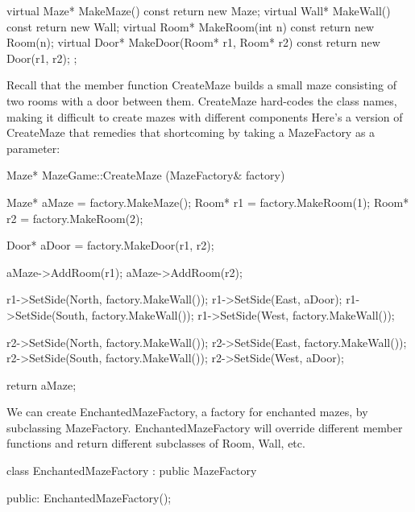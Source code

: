 \documentclass{report}
\begin{document}
\begin{itemize}
\begin{cppcode}
{                        virtual Maze* MakeMaze() const
                        { return new Maze; }
                        virtual Wall* MakeWall() const
                        { return new Wall; }
                        virtual Room* MakeRoom(int n) const
                        { return new Room(n); }
                        virtual Door* MakeDoor(Room* r1, Room* r2) const
                        { return new Door(r1, r2); }
                    };
                \end{cppcode}
                \bigbreak \noindent 
                Recall that the member function CreateMaze builds a small maze consisting of two rooms with a door between them. CreateMaze hard-codes the class names, making it difficult to create mazes with different components
                \bigbreak \noindent 
                Here's a version of CreateMaze that remedies that shortcoming by taking a MazeFactory as a parameter:
                \bigbreak \noindent 
                \begin{cppcode}
                    Maze* MazeGame::CreateMaze (MazeFactory& factory) {
                        Maze* aMaze = factory.MakeMaze();
                        Room* r1 = factory.MakeRoom(1);
                        Room* r2 = factory.MakeRoom(2);

                        Door* aDoor = factory.MakeDoor(r1, r2);

                        aMaze->AddRoom(r1);
                        aMaze->AddRoom(r2);

                        r1->SetSide(North, factory.MakeWall());
                        r1->SetSide(East, aDoor);
                        r1->SetSide(South, factory.MakeWall());
                        r1->SetSide(West, factory.MakeWall());

                        r2->SetSide(North, factory.MakeWall());
                        r2->SetSide(East, factory.MakeWall());
                        r2->SetSide(South, factory.MakeWall());
                        r2->SetSide(West, aDoor);

                        return aMaze;
                    }
                \end{cppcode}
                \bigbreak \noindent 
                We can create EnchantedMazeFactory, a factory for enchanted mazes, by subclassing MazeFactory. EnchantedMazeFactory will override different member functions and return different subclasses of Room, Wall, etc.
                \bigbreak \noindent 
                \begin{cppcode}
                    class EnchantedMazeFactory : public MazeFactory {
                        public:
                        EnchantedMazeFactory();

}
\end{cppcode}
\end{itemize}
\end{document}
